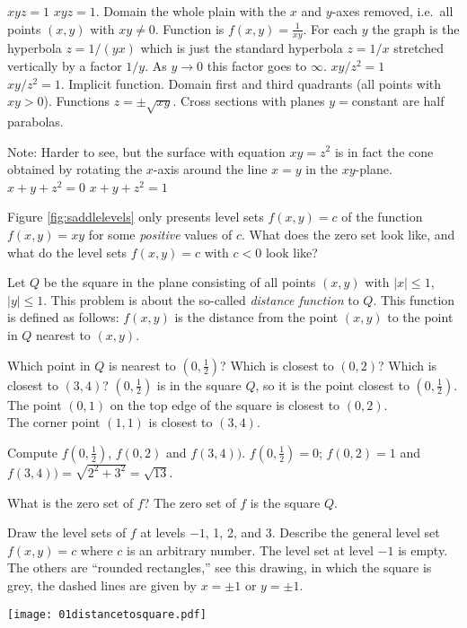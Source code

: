\endanswer
\subprob $xyz=1$
\answer%
$xyz=1$.
Domain the whole plain with the $x$ and $y$-axes removed, i.e.\ all
points $(x, y)$ with $xy\ne0$.
Function is $f(x, y) = \frac{1} {xy}$.
For each $y$ the graph is the hyperbola $z=1/(yx)$ which is just the
standard hyperbola $z=1/x$ stretched vertically by a factor $1/y$.
As $y\to 0$ this factor goes to $\infty$.
\endanswer
\subprob $xy/z^2=1$\\
\answer%
$xy/z^2=1$.
Implicit function.
Domain first and third quadrants (all points with $xy>0$).
Functions $z= \pm \sqrt{xy}$.
Cross sections with planes $y=$constant are half parabolas.

Note: Harder to see, but the surface with equation $xy=z^2$ is in fact
the cone obtained by rotating the $x$-axis around the line
$x=y$ in the $xy$-plane.
\endanswer
\subprob $x+y+z^2=0$
\subprob $x+y+z^2=1$

\problem Figure \ref{fig:saddlelevels} only presents level sets%
$f(x, y)=c$ of the function $f(x, y) = xy$ for some \emph{positive} values
of $c$.  What does the zero set look like, and what do the level sets
$f(x, y) = c$ with $c<0$ look like?

\problem
\label{prb:distance-to-square-level-sets}
Let $Q$ be the square in the plane consisting of all points $(x,y)$
with $|x|\le1$, $|y|\le1$.  This problem is about the so-called
\emph{distance function} to $Q$.  This function is defined as
follows:  $f(x, y)$ is the distance from the point $(x,y)$ to the
point in $Q$ nearest to $(x,y)$.

\subprob Which point in $Q$ is nearest to $(0, \frac12)$?  Which is
closest to $(0, 2)$?  Which is closest to $(3,4)$?
\answer%
$(0, \frac{1} {2})$ is in the square $Q$, so it is the point closest to
$(0, \frac{1} {2})$.\\
The point $(0,1)$ on the top edge of the square is closest to $(0,2)$.\\
The corner point $(1,1)$ is closest to $(3,4)$.
\endanswer

\subprob Compute $f(0, \frac12)$, $f(0,2)$ and $f(3, 4))$.
\answer%
$f(0, \frac12) =0 $;
$f(0,2)=1$ and $f(3, 4))=\sqrt{2^2+3^2}=\sqrt{13}$.
\endanswer

\subprob What is the zero set of $f$?
\answer%
The zero set of $f$ is the square $Q$.
\endanswer

\subprob Draw the level sets of $f$ at levels $-1$, 1, 2, and 3.  Describe
the general level set $f(x, y) = c$ where $c$ is an arbitrary number.
\answer%
The level set at level $-1$ is empty.  The others are ``rounded
rectangles,'' see this drawing, in which the square is grey, the dashed
lines are given by $x=\pm1$ or $y=\pm1$.
\begin{center}
    \texttt{[image: 01distancetosquare.pdf]}
\end{center}
\endanswer

